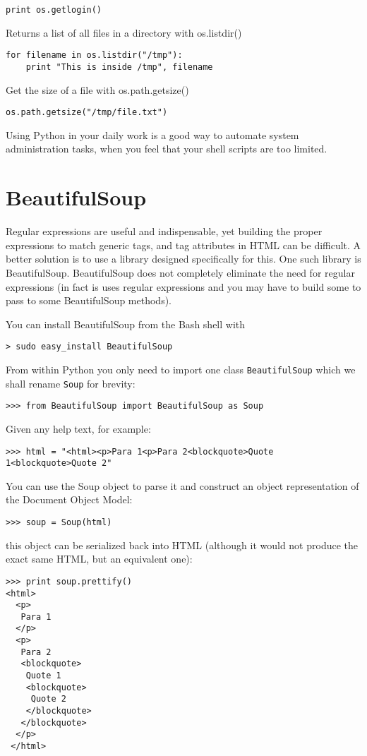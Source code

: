\documentclass[justified,sixbynine]{tufte-book}
\def\ft{\small\tt}
\theoremstyle{plain}%
\theoremstyle{definition}
\theoremstyle{remark}
\begin{document}
\begin{fullwidth}
\begin{lstlisting}
print os.getlogin()
\end{lstlisting}
Returns a list of all files in a directory with os.listdir()

\begin{lstlisting}
for filename in os.listdir("/tmp"):
    print "This is inside /tmp", filename
\end{lstlisting}
Get the size of a file with os.path.getsize()
\begin{lstlisting}
os.path.getsize("/tmp/file.txt")
\end{lstlisting}
Using Python in your daily work is a good way to automate system administration
tasks, when you feel that your shell scripts are too limited.

\goodbreak\chapter{BeautifulSoup}

Regular expressions are useful and indispensable, yet building the proper expressions to match generic tags, and tag attributes in HTML can be difficult. A better solution is to use a library designed specifically for this. One such library is BeautifulSoup. BeautifulSoup does not completely eliminate the need for regular expressions (in fact is uses regular expressions and you may have to build some to pass to some BeautifulSoup methods).

You can install BeautifulSoup from the Bash shell with
\begin{lstlisting}
> sudo easy_install BeautifulSoup
\end{lstlisting}

From within Python you only need to import one class {\ft BeautifulSoup} which we shall rename {\ft Soup} for brevity:

\begin{lstlisting}
>>> from BeautifulSoup import BeautifulSoup as Soup
\end{lstlisting}
Given any help text, for example:
\begin{lstlisting}
>>> html = "<html><p>Para 1<p>Para 2<blockquote>Quote 1<blockquote>Quote 2"
\end{lstlisting}
You can use the Soup object to parse it and construct an object representation of the Document Object Model:
\begin{lstlisting}
>>> soup = Soup(html)
\end{lstlisting}
this object can be serialized back into HTML (although it would not produce the exact same HTML, but an equivalent one):
\begin{lstlisting}
>>> print soup.prettify()
<html>
  <p>
   Para 1
  </p>
  <p>
   Para 2
   <blockquote>
    Quote 1
    <blockquote>
     Quote 2
    </blockquote>
   </blockquote>
  </p>
 </html>
\end{lstlisting}


\end{fullwidth}
\end{document}
